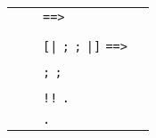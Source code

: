 \begin{isabellebody}
\begin{isamarkuptext}
\begin{center}
\begin{supertabular}{rclr}
    & \isa{{\isachardoublequote}{\isacharbar}{\isachardoublequote}} &  \verb|==>|  &  \\
    & \isa{{\isachardoublequote}{\isacharbar}{\isachardoublequote}} &  \isa{{\isachardoublequote}{\isasymLongrightarrow}{\isachardoublequote}}  &  \\
    & \isa{{\isachardoublequote}{\isacharbar}{\isachardoublequote}} & \verb|[|\verb,|,\verb||  \verb|;| \isa{{\isachardoublequote}{\isasymdots}{\isachardoublequote}} \verb|;|  \verb||\verb,|,\verb|]| \verb|==>|  &  \\
    & \isa{{\isachardoublequote}{\isacharbar}{\isachardoublequote}} & \isa{{\isachardoublequote}{\isasymlbrakk}{\isachardoublequote}}  \verb|;| \isa{{\isachardoublequote}{\isasymdots}{\isachardoublequote}} \verb|;|  \isa{{\isachardoublequote}{\isasymrbrakk}{\isachardoublequote}} \isa{{\isachardoublequote}{\isasymLongrightarrow}{\isachardoublequote}}  &  \\
    & \isa{{\isachardoublequote}{\isacharbar}{\isachardoublequote}} & \verb|!!|  \verb|.|  &  \\
    & \isa{{\isachardoublequote}{\isacharbar}{\isachardoublequote}} & \isa{{\isachardoublequote}{\isasymAnd}{\isachardoublequote}}  \verb|.|  &  \\

\end{supertabular}
\end{center}
\end{isamarkuptext}
\end{isabellebody}
